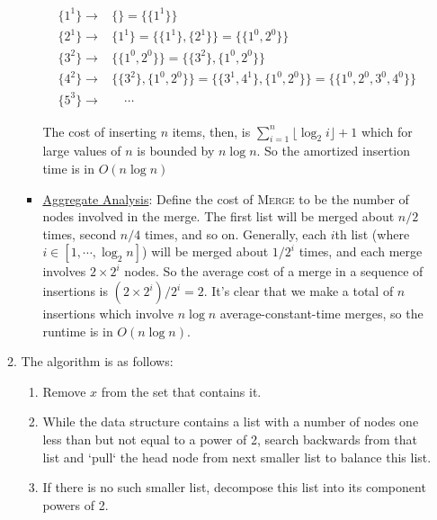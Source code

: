 \documentclass{article}
\begin{document}
\begin{enumerate}
\begin{enumerate}
\begin{itemize}
            \begin{equation*}
            \begin{aligned}
                \{1^1\} \rightarrow& \big\{\big\} = \big\{\{1^1\}\big\} \\
                \{2^1\} \rightarrow& \big\{1^1\big\} = \big\{\{1^1\}, \{2^1\}\big\} = \big\{\{1^0, 2^0\}\big\} \\
                \{3^2\} \rightarrow& \big\{\{1^0, 2^0\}\big\} = \big\{\{3^2\}, \{1^0, 2^0\}\big\} \\
                \{4^2\} \rightarrow& \big\{\{3^2\}, \{1^0, 2^0\}\big\} = \big\{\{3^1, 4^1\}, \{1^0, 2^0\}\big\} = \big\{\{1^0, 2^0, 3^0, 4^0\}\big\} \\
                \{5^3\} \rightarrow& \quad \cdots
            \end{aligned}
            \end{equation*}

            The cost of inserting $n$ items, then, is $\sum_{i = 1}^n \lfloor \log_2 i \rfloor + 1$ which for large values of $n$ is bounded by $n \log n$. So the amortized insertion time is in $O(n \log n)$

            \item \underline{Aggregate Analysis}: Define the cost of \textsc{Merge} to be the number of nodes involved in the merge. The first list will be merged about $n / 2$ times, second $n / 4$ times, and so on. Generally, each $i$th list (where $i \in [1, \cdots, \log_2{n}]$) will be merged about $1 / 2^i$ times, and each merge involves $2 \times 2^i$ nodes. So the average cost of a merge in a sequence of insertions is $(2 \times 2^i) / 2^i = 2$. It's clear that we make a total of $n$ insertions which involve $n \log n$ average-constant-time merges, so the runtime is in $O(n \log n)$.
        \end{itemize}
    \item The algorithm is as follows:
        \begin{enumerate}
        \item Remove $x$ from the set that contains it.
        \item While the data structure contains a list with a number of nodes one less than but not equal to a power of 2, search backwards from that list and `pull` the head node from next smaller list to balance this list.
        \item If there is no such smaller list, decompose this list into its component powers of 2.
        \end{enumerate}


\end{enumerate}
\end{enumerate}
\end{document}
